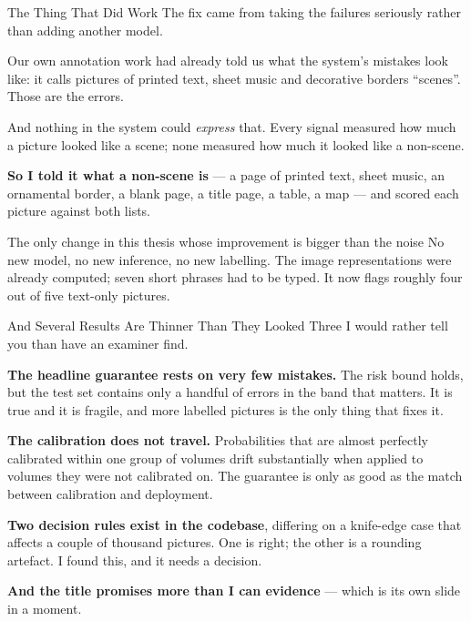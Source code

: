 \documentclass[aspectratio=169,11pt]{beamer}
\begin{document}
\begin{frame}{The Thing That Did Work}
\small
The fix came from taking the failures seriously rather than adding another model.
\vspace{2mm}

\small
Our own annotation work had already told us what the system's mistakes look like: it calls pictures of printed text, sheet music and decorative borders ``scenes''. Those are the errors.
\vspace{1.5mm}

And nothing in the system could \emph{express} that. Every signal measured how much a picture looked like a scene; none measured how much it looked like a non-scene.
\vspace{2mm}

\textbf{So I told it what a non-scene is} --- a page of printed text, sheet music, an ornamental border, a blank page, a title page, a table, a map --- and scored each picture against both lists.
\vspace{2mm}

\begin{exampleblock}{\small The only change in this thesis whose improvement is bigger than the noise}
No new model, no new inference, no new labelling. The image representations were already computed; seven short phrases had to be typed. It now flags roughly four out of five text-only pictures.
\end{exampleblock}
\end{frame}

\begin{frame}{And Several Results Are Thinner Than They Looked}
\small
Three I would rather tell you than have an examiner find.
\vspace{2mm}

\small
\textbf{The headline guarantee rests on very few mistakes.} The risk bound holds, but the test set contains only a handful of errors in the band that matters. It is true and it is fragile, and more labelled pictures is the only thing that fixes it.
\vspace{1.5mm}

\textbf{The calibration does not travel.} Probabilities that are almost perfectly calibrated within one group of volumes drift substantially when applied to volumes they were not calibrated on. The guarantee is only as good as the match between calibration and deployment.
\vspace{1.5mm}

\textbf{Two decision rules exist in the codebase}, differing on a knife-edge case that affects a couple of thousand pictures. One is right; the other is a rounding artefact. I found this, and it needs a decision.
\vspace{2mm}

\textbf{And the title promises more than I can evidence} --- which is its own slide in a moment.
\end{frame}
\end{document}
